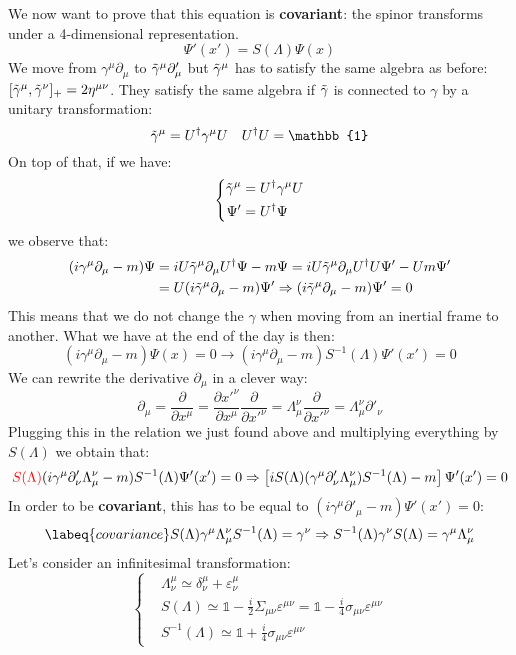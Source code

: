 \documentclass[../main.tex]{subfiles}
\begin{document}
We now want to prove that this equation is \textbf{covariant}: the spinor transforms under a 4-dimensional representation.
\[
\Psi'(x')=S(\Lambda)\Psi(x)
\]
We move from $\gamma^\mu\partial_\mu$ to $\Tilde{\gamma}^\mu\partial'_\mu$ but $\Tilde{\gamma}^\mu$ has to satisfy the same algebra as before: $[\Tilde{\gamma}^\mu,\Tilde{\gamma}^\nu]_+=2\eta^{\mu\nu}$. They satisfy the same algebra if $\Tilde{\gamma}$ is connected to $\gamma$ by a unitary transformation:
\[
\Tilde{\gamma}^\mu=U^\dagger\gamma^\mu U \quad U^\dagger U=\mathbb{1}
\]
On top of that, if we have:
\[
\left\{
\begin{aligned}
\Tilde{\gamma}^\mu&=U^\dagger\gamma^\mu U\\
\Psi'&=U^\dagger\Psi
\end{aligned}
\right.
\]
we observe that:
\begin{align*}
(i\gamma^\mu\partial_\mu-m)\Psi&=iU\Tilde{\gamma}^\mu\partial_\mu U^\dagger\Psi-m\Psi=iU\Tilde{\gamma}^\mu\partial_\mu U^\dagger U\Psi'-Um\Psi'\\
&=U(i\Tilde{\gamma}^\mu\partial_\mu-m)\Psi'\Rightarrow(i\Tilde{\gamma}^\mu\partial_\mu-m)\Psi'=0
\end{align*}
This means that we do not change the $\gamma$ when moving from an inertial frame to another. What we have at the end of the day is then:
\[
(i\gamma^\mu\partial_\mu-m)\Psi(x)=0\xrightarrow[]{}(i\gamma^\mu\partial_\mu-m)S^{-1}(\Lambda)\Psi'(x')=0
\]
We can rewrite the derivative $\partial_\mu$ in a clever way:
\[
\partial_\mu=\frac{\partial}{\partial x^\mu}=\frac{\partial x'^\nu}{\partial x^\mu}\frac{\partial}{\partial x'^\nu}=\Lambda^\nu_\mu\frac{\partial}{\partial x'^\nu}=\Lambda^\nu_\mu\partial'_\nu
\]
Plugging this in the relation we just found above and multiplying everything by $S(\Lambda)$ we obtain that:
\[
{\color{red}S(\Lambda)}(i\gamma^\mu\partial'_\nu\Lambda^\nu_\mu-m)S^{-1}(\Lambda)\Psi'(x')=0\Rightarrow\left[iS(\Lambda)(\gamma^\mu\partial'_\nu\Lambda^\nu_\mu)S^{-1}(\Lambda)-m\right]\Psi'(x')=0
\]
In order to be \textbf{covariant}, this has to be equal to $(i\gamma^\mu\partial'_\mu-m)\Psi'(x')=0$:
\begin{equation}
\labeq{covariance}
S(\Lambda)\gamma^\mu\Lambda^\nu_\mu S^{-1}(\Lambda)=\gamma^\nu\Rightarrow S^{-1}(\Lambda)\gamma^\nu S(\Lambda)=\gamma^\mu\Lambda^\nu_\mu
\end{equation}
Let's consider an infinitesimal transformation:
\[
\left\{
\begin{aligned}
&\Lambda^\mu_\nu\simeq\delta^\mu_\nu+\varepsilon^\mu_\nu\\
&S(\Lambda)\simeq\mathbb{1}-\frac{i}{2}\Sigma_{\mu\nu}\varepsilon^{\mu\nu}=\mathbb{1}-\frac{i}{4}\sigma_{\mu\nu}\varepsilon^{\mu\nu}\\
&S^{-1}(\Lambda)\simeq\mathbb{1}+\frac{i}{4}\sigma_{\mu\nu}\varepsilon^{\mu\nu}
\end{aligned}
\right.
\]
\end{document}
